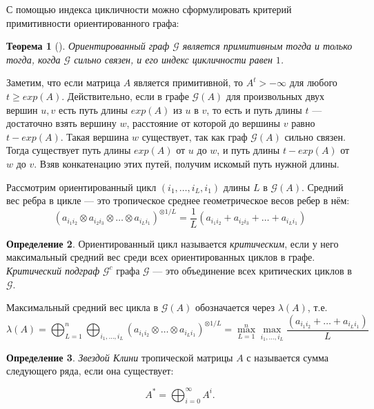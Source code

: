 \documentclass[12pt]{article}
\newtheorem{theorem}{Теорема}[section]
\theoremstyle{definition}
\newtheorem{definition}[theorem]{Определение}
\begin{document}
С помощью индекса цикличности можно сформулировать критерий примитивности ориентированного графа:

\begin{theorem} [{\cite[теорема 3.4.4]{combinatorialMatrixTheory}}]
Ориентированный граф $\mathcal{G}$ является примитивным тогда и только тогда, когда $\mathcal{G}$ сильно связен, и его индекс цикличности равен $1$.
\end{theorem}

Заметим, что если матрица $A$ является примитивной, то $A^t > -\infty$ для любого $t \ge exp(A)$. Действительно, если в графе $\mathcal{G}(A)$ для произвольных двух вершин $u, v$ есть путь длины $exp(A)$ из $u$ в $v$, то есть и путь длины $t$ --- достаточно взять вершину $w$, расстояние от которой до вершины $v$ равно $t - exp(A)$. Такая вершина $w$ существует, так как граф $\mathcal{G}(A)$ сильно связен. Тогда существует путь длины $exp(A)$ от $u$ до $w$, и путь длины $t - exp(A)$ от $w$ до $v$. Взяв конкатенацию этих путей, получим искомый путь нужной длины.

Рассмотрим ориентированный цикл $(i_1, \dots, i_L, i_1)$ длины $L$ в $\mathcal{G}(A)$. Средний вес ребра в цикле --- это тропическое среднее геометрическое весов ребер в нём:
\begin{equation*}
    (a_{i_1 i_2} \otimes a_{i_2 i_3} \otimes \dots \otimes a_{i_L i_1})^{\otimes{1/L}} =
    \frac{1}{L}(a_{i_1 i_2} + a_{i_2 i_3} + \dots + a_{i_L i_1})
\end{equation*}

\begin{definition}
Ориентированный цикл называется \textit{критическим}, если у него максимальный средний вес среди всех ориентированных циклов в графе. \textit{Критический подграф} $\mathcal{G}^c$ графа $\mathcal{G}$ --- это объединение всех критических циклов в $\mathcal{G}$.

Максимальный средний вес цикла в $\mathcal{G}(A)$ обозначается через $\lambda(A)$, т.е.
\begin{equation*}
        \lambda(A) = \bigoplus_{L = 1}^n \bigoplus_{i_1, \dots, i_L} (a_{i_1 i_2} \otimes \dots \otimes a_{i_L i_1})^{\otimes{1/L}} = \max_{L = 1}^n \max_{i_1, \dots, i_L} \frac{(a_{{i_1}{i_2}} + \dots + a_{{i_{L}}{i_1}})}{L}
\end{equation*}
\end{definition}

\begin{definition}
\textit{Звездой Клини} тропической матрицы $A$ с называется сумма следующего ряда, если она существует:

\begin{equation}
\label{kleenyEq}
    A^* = \bigoplus_{i = 0}^{\infty} A^i.
\end{equation}
\end{definition}
\end{document}
